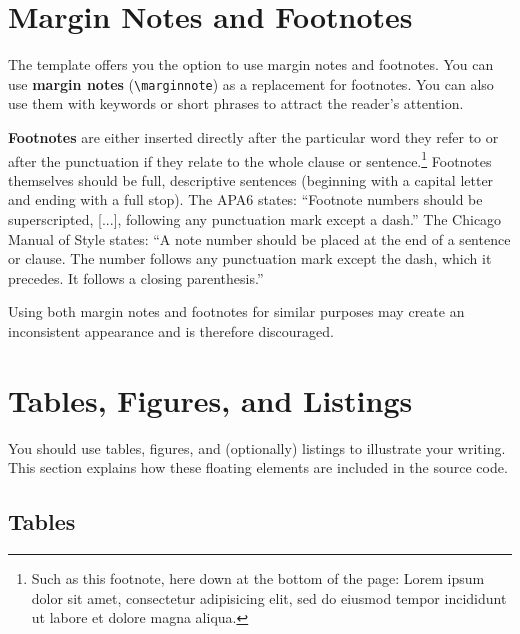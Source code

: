 \section{Margin Notes and Footnotes}

The template offers you the option to use margin notes and footnotes. You can use \textbf{margin notes} (\verb|\marginnote|) as a replacement for footnotes. You can also use them with keywords or short phrases to attract the reader's attention.

\textbf{Footnotes} are either inserted directly after the particular word they refer to or after the punctuation if they relate to the whole clause or sentence.\footnote{Such as this footnote, here down at the bottom of the page: Lorem ipsum dolor sit amet, consectetur adipisicing elit, sed do eiusmod tempor incididunt ut labore et dolore magna aliqua.} Footnotes themselves should be full, descriptive sentences (beginning with a capital letter and ending with a full stop). The APA6 states: \enquote{Footnote numbers should be superscripted, [...], following any punctuation mark except a dash.} The Chicago Manual of Style states: \enquote{A note number should be placed at the end of a sentence or clause. The number follows any punctuation mark except the dash, which it precedes. It follows a closing parenthesis.}

Using both margin notes and footnotes for similar purposes may create an inconsistent appearance and is therefore discouraged.

\section{Tables, Figures, and Listings}

You%
should use tables, figures, and (optionally) listings to illustrate your writing. This section explains how these floating elements are included in the source code.

\subsection{Tables}

